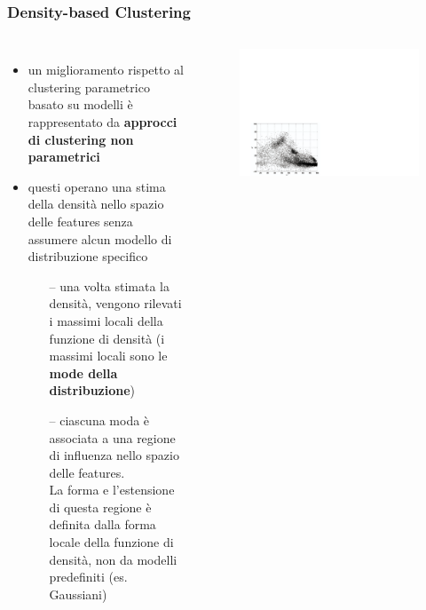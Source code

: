 \begin{frame}

	\frametitle{{\color{GradientDescentDiagramRed}Density-based Clustering}}


		\begin{columns}

			\begin{itemize}
				\item un miglioramento rispetto al clustering parametrico basato su modelli è rappresentato da \textbf{approcci di clustering non parametrici}
				\item questi operano una stima della densità nello spazio delle features senza assumere alcun modello di distribuzione specifico
					\begin{itemize}
						\item[--] una volta stimata la densità, vengono rilevati i massimi locali della funzione di densità (i massimi locali sono le \textbf{mode della distribuzione})
						\item[--] ciascuna moda è associata a una regione di influenza nello spazio delle features.\\
							La forma e l'estensione di questa regione è definita dalla forma locale della funzione di densità, non da modelli predefiniti (es. Gaussiani)
					\end{itemize}
			\end{itemize}
			\begin{figure}[!htbp]
				\centering
				\includegraphics[width=1\linewidth]{images/unsupervised/non_parametric/density.pdf}

\end{figure}
\end{columns}
\end{frame}
